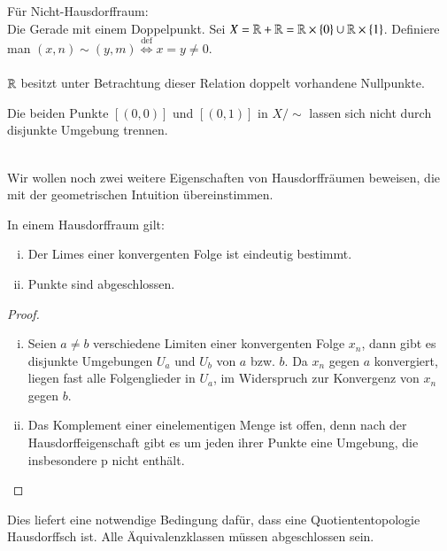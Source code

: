 \documentclass[a4paper,10pt]{scrartcl}
\begin{document}
\begin{ex*} Für Nicht-Hausdorffraum:\\
Die Gerade mit einem Doppelpunkt. Sei $ X=\mathbb{R}+\mathbb{R}=\mathbb{R}\times \{0\}\cup \mathbb{R}\times \{1\} $. Definiere man $ (x,n)\sim (y,m)\stackrel{\text{def}}{\iff} x=y\neq 0 $. \\
\fixme[fig16]\\
$ \mathbb{R} $ besitzt unter Betrachtung dieser Relation doppelt vorhandene Nullpunkte.

Die beiden Punkte $[(0,0)]$ und $[(0,1)]$ in $ X/\sim $ lassen sich nicht durch disjunkte Umgebung trennen.\\
\fixme[fig17]\\
\end{ex*}
Wir wollen noch zwei weitere Eigenschaften von Hausdorffräumen beweisen, die mit der geometrischen Intuition übereinstimmen.
\begin{st}
In einem Hausdorffraum gilt:
\begin{enumerate}[(i)]
\item Der Limes einer konvergenten Folge ist eindeutig bestimmt.
\item Punkte sind abgeschlossen.
\end{enumerate}
\end{st}
\begin{proof}
\begin{enumerate}[(i)]
\item Seien $ a\neq b $ verschiedene Limiten einer konvergenten Folge $ x_n $, dann gibt es disjunkte Umgebungen $ U_a $ und $ U_b $ von $ a $ bzw. $ b $.  Da $ x_n $ gegen $ a $ konvergiert, liegen fast alle Folgenglieder in $ U_a $, im Widerspruch zur Konvergenz von $ x_n $ gegen $ b $.
\item Das Komplement einer einelementigen Menge ist offen, denn nach der Hausdorffeigenschaft gibt es um jeden ihrer Punkte eine Umgebung, die insbesondere p nicht enthält.
\end{enumerate}
\end{proof}
\fixme[fig18]
\begin{note*}
Dies liefert eine notwendige Bedingung dafür, dass eine Quotiententopologie Hausdorffsch ist.  Alle Äquivalenzklassen müssen abgeschlossen sein.
\end{note*}
\end{document}
